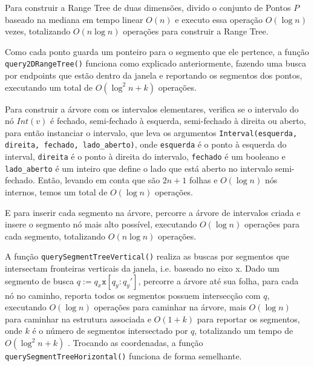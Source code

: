 \documentclass{article}
\theoremstyle{definition}
\begin{document}
\hspace*{15pt} Para construir a Range Tree de duas dimensões, divido
o conjunto de Pontos $P$ baseado na mediana em tempo linear $O(n)$ e 
executo essa operação $O(\log n)$ vezes, totalizando $O(n\log n)$ 
operações para construir a Range Tree.


\hspace*{15pt} Como cada ponto guarda um ponteiro para o segmento que ele
pertence, a função \texttt{query2DRangeTree()} funciona como explicado 
anteriormente, fazendo uma busca por endpoints que estão dentro da janela
e reportando os segmentos dos pontos, executando um total de $O(\log^2n + k)$
operações\cite{bergBook}. 


\hspace*{15pt} Para construir a árvore com os intervalos elementares, verifica
se o intervalo do nó $Int(v)$ é fechado, semi-fechado à esquerda, semi-fechado à direita
ou aberto, para então instanciar o intervalo, que leva os argumentos 
\texttt{Interval(esquerda, direita, fechado, lado\_aberto)}, onde \texttt{esquerda}
é o ponto à esquerda do interval, \texttt{direita} é o ponto à direita do intervalo,
\texttt{fechado} é um booleano e \texttt{lado\_aberto} é um inteiro que 
define o lado que está aberto no intervalo semi-fechado. Então, levando em conta
que são $2n + 1$ folhas e $O(\log n)$ nós internos, temos um total de 
$O(\log n)$ operações.


E para inserir cada segmento na árvore, percorre a árvore de intervalos
criada e insere o segmento nó mais alto possível, executando $O(\log n)$ operações 
para cada segmento, totalizando $O(n\log n)$ operações\cite{bergBook}.


A função \texttt{querySegmentTreeVertical()}
realiza as buscas por segmentos que intersectam fronteiras verticais
da janela, i.e. baseado no eixo x. Dado um segmento de busca $q := q_x \texttt{x} [q_y:q_y']$, 
percorre a árvore até sua folha, para cada nó no caminho, reporta todos
os segmentos possuem intersecção com $q$, executando $O(\log n)$ operações
para caminhar na árvore, mais $O(\log n)$ para caminhar na estrutura associada
e $O(1 + k)$ para reportar os segmentos, onde $k$ é o número de segmentos 
intersectado por $q$, totalizando um tempo de $O(\log^2n + k)$ \cite{bergBook}. 
Trocando as coordenadas, a função \texttt{querySegmentTreeHorizontal()}
funciona de forma semelhante.


\newpage


\end{document}
